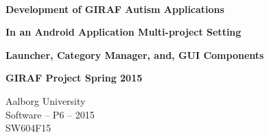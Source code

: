 
\begin{center}

	\vspace*{\fill}

	\hrulefill\newline \\

	\begin{huge}	
		\textbf{Development of GIRAF Autism Applications}
	\end{huge}

	\vspace{0.6cm}

	\begin{Large}
		\textbf{In an Android Application Multi-project Setting}
	\end{Large}

	\vspace{0.6cm}

	\begin{large}
		\textbf{Launcher, Category Manager, and, GUI Components}
	\end{large}

	\vspace{1cm}

	\begin{large} 
		\textbf{GIRAF Project Spring 2015}
	\end{large}

	\hrulefill\newline

	Aalborg University		\\
	Software -- P6 -- 2015	\\
	SW604F15				\\
    
	\vspace*{\fill}

\end{center}
\thispagestyle{empty}